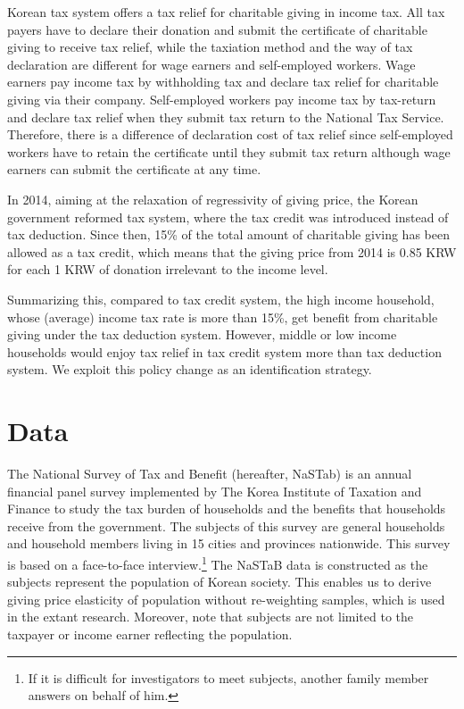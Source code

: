 \documentclass[
  11pt,
  a4paper,
]{article}
\begin{document}
Korean tax system offers a tax relief for charitable giving in income tax. All tax payers have to declare their donation and submit the certificate of charitable giving to receive tax relief, while the taxiation method and the way of tax declaration are different for wage earners and self-employed workers. Wage earners pay income tax by withholding tax and declare tax relief for charitable giving via their company. Self-employed workers pay income tax by tax-return and declare tax relief when they submit tax return to the National Tax Service. Therefore, there is a difference of declaration cost of tax relief since self-employed workers have to retain the certificate until they submit tax return although wage earners can submit the certificate at any time.

In 2014, aiming at the relaxation of regressivity of giving price, the Korean government reformed tax system, where the tax credit was introduced instead of tax deduction. Since then, 15\% of the total amount of charitable giving has been allowed as a tax credit, which means that the giving price from 2014 is 0.85 KRW for each 1 KRW of donation irrelevant to the income level.

Summarizing this, compared to tax credit system, the high income household, whose (average) income tax rate is more than 15\%, get benefit from charitable giving under the tax deduction system. However, middle or low income households would enjoy tax relief in tax credit system more than tax deduction system. We exploit this policy change as an identification strategy.

\hypertarget{data}{%
\section{Data}\label{data}}

The National Survey of Tax and Benefit (hereafter, NaSTab) is an annual financial panel survey
implemented by The Korea Institute of Taxation and Finance
to study the tax burden of households and the benefits that households receive from the government.
The subjects of this survey are general households and household members living in 15 cities and provinces nationwide.
This survey is based on a face-to-face interview.\footnote{If it is difficult for investigators to meet subjects, another family member answers on behalf of him.}
The NaSTaB data is constructed as the subjects represent the population of Korean society.
This enables us to derive giving price elasticity of population without re-weighting samples, which is used in the extant research.
Moreover, note that subjects are not limited to the taxpayer or income earner reflecting the population.
\end{document}
